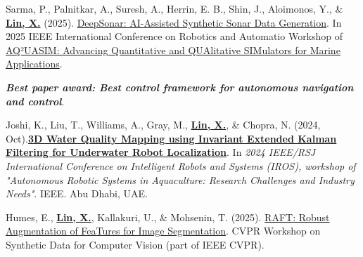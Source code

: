 \documentclass[a4paper,11pt]{article}
\begin{document}
{\begin{enumerate}[leftmargin=*, labelsep=0.5em, align=left, widest={[\textbf{W.1}]}, itemindent=0em, label={\textbf{[\arabic*]}}]
\item[\textbf{[W.3]}] Sarma, P., Palnitkar, A., Suresh, A., Herrin, E. B., Shin, J., Aloimonos, Y., \& \textbf{\underline{Lin, X.}} (2025). \href{https://xiaominlin.github.io/files/ICRA2025_AQ2UASIM_DEEPSONAR.pdf}{DeepSonar: AI-Assisted Synthetic Sonar Data Generation}. In 2025 IEEE
International Conference on Robotics and Automatio Workshop of \href{https://sites.google.com/view/aq2uasim/call-for-papers}{AQ²UASIM: Advancing Quantitative and QUAlitative SIMulators for Marine Applications}.

\item[\textbf{[W.2]}]  \textbf{\textit{Best paper award: Best control framework for autonomous navigation and control}}. 

Joshi, K., Liu, T., Williams, A., Gray, M., \textbf{\underline{Lin, X.}}, \& Chopra, N. (2024, Oct).\href{https://arxiv.org/pdf/2409.11578}{\textbf{3D Water Quality Mapping using Invariant Extended Kalman Filtering for Underwater Robot Localization}}. In \textit{2024 IEEE/RSJ International Conference on Intelligent Robots and Systems (IROS), workshop of "Autonomous Robotic Systems in Aquaculture: Research Challenges and Industry Needs"}. IEEE. Abu Dhabi, UAE.    
\item[\textbf{[W.1]}] Humes, E., \textbf{\underline{Lin, X.}}, Kallakuri, U., \& Mohsenin, T. (2025). \href{https://arxiv.org/abs/2505.04529}{RAFT: Robust Augmentation of FeaTures for Image Segmentation}. CVPR Workshop on Synthetic Data for Computer Vision (part of IEEE CVPR).
\end{enumerate}}
\vspace{-6mm}
\end{document}
